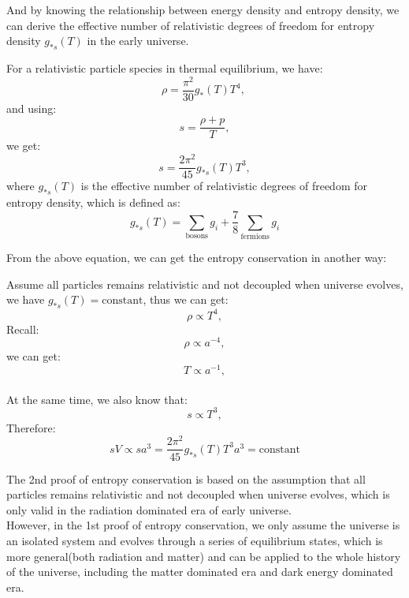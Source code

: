 \bigskip\noindent
And by knowing the relationship between energy density and entropy density, we can derive the effective number of relativistic degrees of freedom for entropy density $g_{*s}(T)$ in the early universe.
\begin{theory}
    For a relativistic particle species in thermal equilibrium, we have:
    \[
        \rho = \frac{\pi^2}{30} g_*(T) T^4, \
    \]
    and using:
    \[
        s = \frac{\rho + p}{T},
    \]
    we get:
    \[
        s = \frac{2\pi^2}{45} g_{*s}(T) T^3,
    \]
    where $g_{*s}(T)$ is the effective number of relativistic degrees of freedom for entropy density, which is defined as:
    \[
        g_{*s}(T) = \sum_{\text{bosons}} g_i + \frac{7}{8} \sum_{\text{fermions}} g_i
    \]
\end{theory}

\bigskip \noindent
From the above equation, we can get the entropy conservation in another way:
\begin{foundation}
    Assume all particles remains relativistic and not decoupled when universe evolves, we have $g_{*s}(T) = \text{constant}$, thus we can get:
    \[
        \rho \propto T^4, 
    \]
    Recall:
    \[
        \rho \propto a^{-4},
    \]
    we can get:
    \[
        T \propto a^{-1},
    \] \\

    At the same time, we also know that:
    \[
        s \propto T^3,
    \]
    Therefore:
    \[
        s V \propto s a^3 = \frac{2\pi^2}{45} g_{*s}(T) T^3 a^3 = \text{constant}
    \]
\end{foundation}

\bigskip\noindent
\begin{remark}
    The 2nd proof of entropy conservation is based on the assumption that all particles remains relativistic and not decoupled when universe evolves, which is only valid in the radiation dominated era of early universe. \\

    However, in the 1st proof of entropy conservation, we only assume the universe is an isolated system and evolves through a series of equilibrium states, which is more general(both radiation and matter) and can be applied to the whole history of the universe, including the matter dominated era and dark energy dominated era.
\end{remark}

\clearpage
